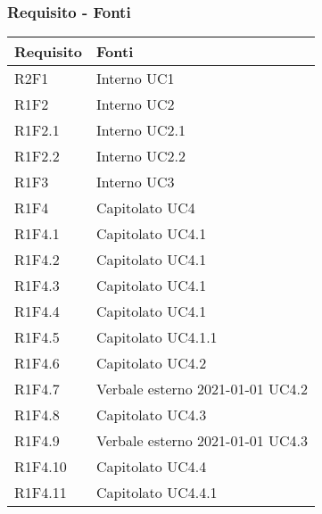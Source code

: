 \subsubsection{Requisito - Fonti}
\begin{center}
	\begin{longtable}{|p{22mm}|p{22mm}|}
		\hline
		\rowcolor{lighter-grayer}
		\textbf{Requisito} &  \textbf{Fonti}  \\
		\hline
		\endhead
		
		R2F1 & 
			Interno \newline
			UC1
		\\
	\hline
		R1F2 & 
		Interno \newline
		UC2
	\\
	\hline
		R1F2.1 & 
		Interno \newline
		UC2.1
	\\
	\hline
		R1F2.2 & 
		Interno \newline
		UC2.2
	\\
	\hline
		R1F3 & 
		Interno \newline
		UC3
	\\
	\hline
R1F4	& 
	Capitolato \newline	
	UC4
	\\
	\hline
R1F4.1	& 
	Capitolato \newline
	UC4.1	
	\\

	\hline
R1F4.2	& 
	Capitolato \newline
	UC4.1	
	\\
	\hline
R1F4.3	& 
	Capitolato \newline
	UC4.1	
	\\

	\hline
R1F4.4	& 
	Capitolato \newline
	UC4.1	
	\\
	\hline
R1F4.5	& 
	Capitolato \newline
	UC4.1.1	
	\\
	\hline
R1F4.6	& 
	Capitolato \newline
	UC4.2	
	\\
	\hline
R1F4.7	& 
	Verbale esterno 2021-01-01 \newline
	UC4.2	
	\\
	\hline
R1F4.8	& 
	Capitolato \newline
	UC4.3	
	\\
	\hline
R1F4.9	& 
	Verbale esterno 2021-01-01 \newline
	UC4.3	
	\\
	\hline
R1F4.10	& 
	Capitolato \newline	
	UC4.4
	\\
	\hline
R1F4.11	& 
	Capitolato \newline
	UC4.4.1	
	\\


\end{longtable}
\end{center}

